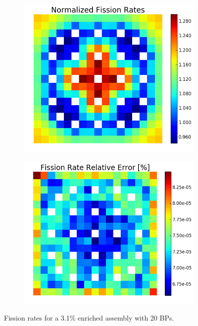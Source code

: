 \begin{figure}[h!]
\centering
\begin{subfigure}{0.5\textwidth}
  \centering
  \includegraphics[width=\linewidth]{figures/benchmarks/fission-rates/fiss-mean-fuel-31-20BAs}
  \caption{}
  \label{fig:chap7-fiss-rate-mean-3.1-20BAs-assm}
\end{subfigure}%
\begin{subfigure}{0.5\textwidth}
  \centering
  \includegraphics[width=\linewidth]{figures/benchmarks/fission-rates/fiss-rel-err-fuel-31-20BAs}
  \caption{}
  \label{fig:chap7-fiss-rate-rel-err-3.1-20BAs-assm}
\end{subfigure}%
\caption[Fission rates for a 3.1\% enriched assembly with 20 BPs]{Fission rates for a 3.1\% enriched assembly with 20 \ac{BP}s.}
\label{fig:chap7-fiss-rates-3.1-assm-20BAs}
\end{figure}

